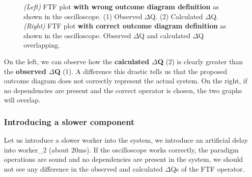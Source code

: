 \begin{figure}[H]
\begin{subfigure}{.5\textwidth}
                    \label{fig:good}%
                \end{subfigure}%
                \caption{\textit{(Left)} FTF plot \textbf{with wrong outcome diagram definition} as shown in the oscilloscope. (1) Observed $\Delta$Q. (2) Calculated $\Delta$Q. \\
                \textit{(Right)} FTF plot \textbf{with correct outcome diagram definition} as shown in the oscilloscope. Observed $\Delta$Q and calculated $\Delta$Q overlapping.}
                \label{fig:ftf_osc}%
            \end{figure}%
        On the left, we can observe how the \textbf{calculated $\Delta$Q} (2) is clearly greater than the \textbf{observed $\Delta$Q} (1). A difference this drastic tells us that the proposed outcome diagram does not correctly represent the actual system. On the right, if no dependencies are present and the correct operator is chosen, the two graphs will overlap.

        \subsubsection{Introducing a slower component}
            Let us introduce a slower worker into the system, we introduce an artificial delay into worker\_2 (about 20ms). If the oscilloscope works correctly, the paradigm operations are sound and no dependencies are present in the system, we should not see any difference in the observed and calculated $\Delta$Qs of the FTF operator.

